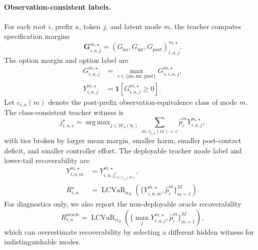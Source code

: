 \documentclass[conference]{IEEEtran}
\DeclareMathOperator*{\argmax}{arg\,max}
\DeclareMathOperator{\LCVaR}{LCVaR}
\begin{document}
\paragraph{Observation-consistent labels.}
For each root $i$, prefix $a$, token $j$, and latent mode $m$, the teacher computes specification margins
\begin{equation}
\label{eq:exp_spec_margin}
    \bm G_{i,a,j}^{m,\star}=
    (G_{\mathrm{no}},G_{\mathrm{mr}},G_{\mathrm{post}})_{i,a,j}^{m,\star}.
\end{equation}
The option margin and option label are
\begin{align}
\label{eq:exp_option_margin_oc}
    G_{i,a,j}^{m,\star}
    &=\max_{s\in\{\mathrm{no},\mathrm{mr},\mathrm{post}\}}G_{s,i,a,j}^{m,\star},\\
\label{eq:exp_option_label_oc}
    Y_{i,a,j}^{m,\star}&=\mathbf 1[G_{i,a,j}^{m,\star}\ge0].
\end{align}
Let $c_{i,a}(m)$ denote the post-prefix observation-equivalence class of mode $m$.  The class-consistent teacher witness is
\begin{equation}
\label{eq:exp_class_witness_oc}
    j_{i,a,c}^{\star}=
    \argmax_{j\in\mathcal W_a(b_i)}
    \sum_{m:c_{i,a}(m)=c}\hat p_i^m Y_{i,a,j}^{m,\star},
\end{equation}
with ties broken by larger mean margin, smaller harm, smaller post-contact deficit, and smaller controller effort.  The deployable teacher mode label and lower-tail recoverability are
\begin{align}
\label{eq:exp_oc_mode_label}
    Y_{i,a,\mathrm{oc}}^{m,\star}
    &=Y_{i,a,j_{i,a,c_{i,a}(m)}^\star}^{m,\star},\\
\label{eq:exp_true_recoverability}
    R_{i,a}^{\star}
    &=\LCVaR_{\alpha_R}
    \left(\{Y_{i,a,\mathrm{oc}}^{m,\star},\hat p_i^m\}_{m=1}^{M}\right).
\end{align}
For diagnostics only, we also report the non-deployable oracle recoverability
\begin{equation}
\label{eq:exp_oracle_recoverability}
    R_{i,a}^{\mathrm{oracle}}=
    \LCVaR_{\alpha_R}
    \left(\{\max_j Y_{i,a,j}^{m,\star},\hat p_i^m\}_{m=1}^{M}\right),
\end{equation}
which can overestimate recoverability by selecting a different hidden witness for indistinguishable modes.
\end{document}
